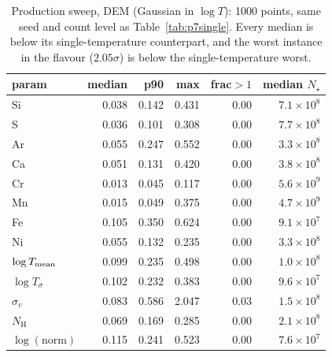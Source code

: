 \documentclass[11pt,a4paper]{article}
\newcommand{\nh}{N_{\mathrm{H}}}
\begin{document}
\begin{table}[htbp]
\centering
\caption{Production sweep, DEM (Gaussian in $\log T$): 1000 points, same seed
and count level as Table~\ref{tab:p7single}. Every median is below its
single-temperature counterpart, and the worst instance in the flavour
($2.05\sigma$) is below the single-temperature worst.}
\label{tab:p7dem}
\begin{tabular}{lrrrrr}
\toprule
param & median & p90 & max & frac${>}1$ & median $N_\star$ \\
\midrule
Si                  & 0.038 & 0.142 & 0.431 & 0.00 & $7.1\times10^{8}$ \\
S                   & 0.036 & 0.101 & 0.308 & 0.00 & $7.7\times10^{8}$ \\
Ar                  & 0.055 & 0.247 & 0.552 & 0.00 & $3.3\times10^{8}$ \\
Ca                  & 0.051 & 0.131 & 0.420 & 0.00 & $3.8\times10^{8}$ \\
Cr                  & 0.013 & 0.045 & 0.117 & 0.00 & $5.6\times10^{9}$ \\
Mn                  & 0.015 & 0.049 & 0.375 & 0.00 & $4.7\times10^{9}$ \\
Fe                  & 0.105 & 0.350 & 0.624 & 0.00 & $9.1\times10^{7}$ \\
Ni                  & 0.055 & 0.132 & 0.235 & 0.00 & $3.3\times10^{8}$ \\
$\log T_{\rm mean}$ & 0.099 & 0.235 & 0.498 & 0.00 & $1.0\times10^{8}$ \\
$\log T_\sigma$     & 0.102 & 0.232 & 0.383 & 0.00 & $9.6\times10^{7}$ \\
$\sigma_v$          & 0.083 & 0.586 & 2.047 & 0.03 & $1.5\times10^{8}$ \\
$\nh$               & 0.069 & 0.169 & 0.285 & 0.00 & $2.1\times10^{8}$ \\
$\log(\text{norm})$ & 0.115 & 0.241 & 0.523 & 0.00 & $7.6\times10^{7}$ \\
\bottomrule
\end{tabular}
\end{table}
\end{document}
